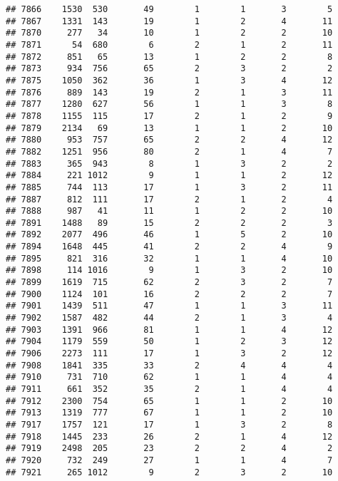 \documentclass[]{article}
\begin{document}
\begin{verbatim}
## 7866    1530  530       49        1        1       3        5
## 7867    1331  143       19        1        2       4       11
## 7870     277   34       10        1        2       2       10
## 7871      54  680        6        2        1       2       11
## 7872     851   65       13        1        2       2        8
## 7873     934  756       65        2        3       2        2
## 7875    1050  362       36        1        3       4       12
## 7876     889  143       19        2        1       3       11
## 7877    1280  627       56        1        1       3        8
## 7878    1155  115       17        2        1       2        9
## 7879    2134   69       13        1        1       2       10
## 7880     953  757       65        2        2       4       12
## 7882    1251  956       80        2        1       4        7
## 7883     365  943        8        1        3       2        2
## 7884     221 1012        9        1        1       2       12
## 7885     744  113       17        1        3       2       11
## 7887     812  111       17        2        1       2        4
## 7888     987   41       11        1        2       2       10
## 7891    1488   89       15        2        2       2        3
## 7892    2077  496       46        1        5       2       10
## 7894    1648  445       41        2        2       4        9
## 7895     821  316       32        1        1       4       10
## 7898     114 1016        9        1        3       2       10
## 7899    1619  715       62        2        3       2        7
## 7900    1124  101       16        2        2       2        7
## 7901    1439  511       47        1        1       3       11
## 7902    1587  482       44        2        1       3        4
## 7903    1391  966       81        1        1       4       12
## 7904    1179  559       50        1        2       3       12
## 7906    2273  111       17        1        3       2       12
## 7908    1841  335       33        2        4       4        4
## 7910     731  710       62        1        1       4        4
## 7911     661  352       35        2        1       4        4
## 7912    2300  754       65        1        1       2       10
## 7913    1319  777       67        1        1       2       10
## 7917    1757  121       17        1        3       2        8
## 7918    1445  233       26        2        1       4       12
## 7919    2498  205       23        2        2       4        2
## 7920     732  249       27        1        1       4        7
## 7921     265 1012        9        2        3       2       10

\end{verbatim}
\end{document}
